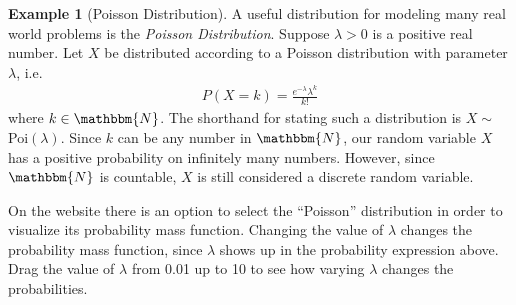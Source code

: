 \documentclass[11pt,letterpaper]{article}
\newcommand\nat{\mathbbm{N}}
\numberwithin{theorem}{section}
\numberwithin{definition}{section}
\numberwithin{lemma}{section}
\numberwithin{corollary}{section}
\numberwithin{proposition}{section}
\theoremstyle{definition}
\numberwithin{remark}{section}
\numberwithin{claim}{section}
\numberwithin{observation}{section}
\numberwithin{fact}{section}
\numberwithin{assumption}{section}
\newtheorem{example}[theorem]{Example}
\numberwithin{example}{section}
\numberwithin{exercise}{section}
\begin{document}
\begin{example}[Poisson Distribution]
A useful distribution for modeling many real world problems is the \textit{Poisson Distribution}. Suppose $\lambda > 0$ is a positive real number. Let $X$ be distributed according to a Poisson distribution with parameter $\lambda$, i.e.
\begin{align*}
P(X = k) = \frac{e^{-\lambda}\lambda^k}{k!}
\end{align*}
where $k \in \nat$. The shorthand for stating such a distribution is $X \sim$ Poi$(\lambda)$. Since $k$ can be any number in $\nat$, our random variable $X$ has a positive probability on infinitely many numbers. However, since $\nat$ is countable, $X$ is still considered a discrete random variable. 

On the website there is an option to select the ``Poisson'' distribution in order to visualize its probability mass function. Changing the value of $\lambda$ changes the probability mass function, since $\lambda$ shows up in the probability expression above. Drag the value of $\lambda$ from 0.01 up to 10 to see how varying $\lambda$ changes the probabilities.
\end{example}
\end{document}
